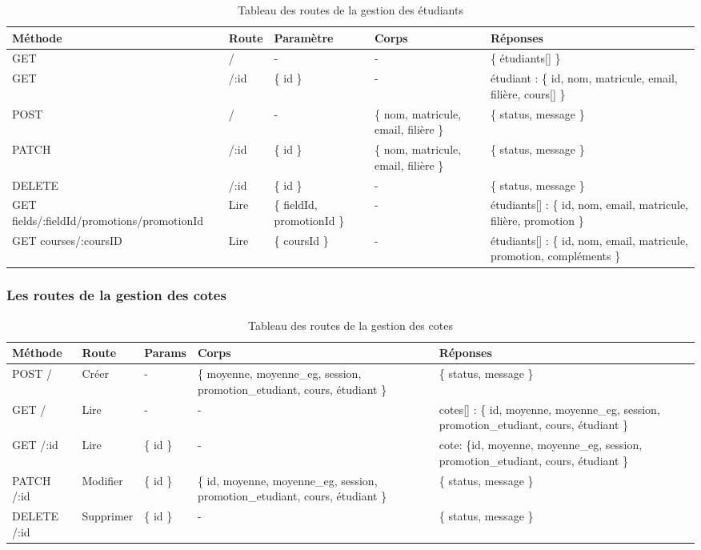 \begin{table}[ht]
  \caption{Tableau des routes de la gestion des étudiants}
  \label{tab:routes-student}
  \begin{tabular}{|p{1.5cm}|p{1cm}|p{1.5cm}|p{3cm}|p{3.5cm}| }
    \hline
    Méthode & Route & Paramètre & Corps & Réponses \\
    \hline
    GET & / & - & - & \{ étudiants[] \} \\
    \hline
    GET & /:id & \{ id \} & - & étudiant : \{ id, nom, matricule, email, filière, cours[] \} \\
    \hline
    POST & / & - & \{ nom, matricule, email, filière \} & \{ status, message \} \\
    \hline
    PATCH & /:id & \{ id \} & \{ nom, matricule, email, filière \} & \{ status, message \} \\
    \hline
    DELETE & /:id & \{ id \} & - & \{ status, message \} \\
    \hline
    GET fields/:fieldId/promotions/promotionId & Lire & \{ fieldId, promotionId \} & - &  étudiants[] : \{ id, nom, email, matricule, filière, promotion \} \\
    \hline
    GET courses/:coursID & Lire & \{ coursId \} & - &  étudiants[] : \{ id, nom, email, matricule, promotion, compléments \} \\
    \hline
  \end{tabular}
\end{table}
\pagebreak

\subsubsection*{Les routes de la gestion des cotes}\label{subsec:routes-grade}

\begin{table}[ht]
  \caption{Tableau des routes de la gestion des cotes}
  \label{tab:routes-grade}
  \begin{tabular}{|p{1.5cm}|p{1cm}|p{1cm}|p{3cm}|p{4cm}| }
    \hline
    Méthode & Route & Params & Corps & Réponses \\
    \hline
        POST /  & Créer &  - &\{ moyenne, moyenne\_eg, session, promotion\_etudiant, cours, étudiant \} & \{ status, message \} \\
    \hline
        GET  / & Lire & - & - & cotes[] :  \{ id, moyenne, moyenne\_eg, session, promotion\_etudiant, cours, étudiant \} \\
    \hline
        GET  /:id  & Lire & \{ id \} & - & cote: \{id, moyenne, moyenne\_eg, session, promotion\_etudiant, cours, étudiant \} \\
    \hline
        PATCH /:id  & Modifier & \{ id \} & \{ id, moyenne, moyenne\_eg, session, promotion\_etudiant, cours, étudiant \} & \{ status, message \} \\
    \hline
        DELETE  /:id & Supprimer  & \{ id \} & - & \{ status, message \} \\
    \hline
  \end{tabular}
\end{table}
\pagebreak

